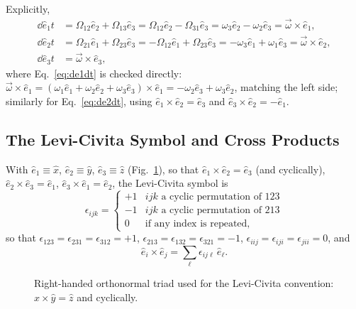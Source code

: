 \documentclass[11pt]{article}
\newcommand{\Om}{\Omega}
\begin{document}
Explicitly,
\begin{align}
\dd{\hat e_1}{t} &= \Om_{12}\hat e_2+\Om_{13}\hat e_3 = \Om_{12}\hat e_2-\Om_{31}\hat e_3 = \omega_3\hat e_2-\omega_2\hat e_3 = \vec\omega\times\hat e_1,\label{eq:de1dt}\\
\dd{\hat e_2}{t} &= \Om_{21}\hat e_1+\Om_{23}\hat e_3 = -\Om_{12}\hat e_1+\Om_{23}\hat e_3 = -\omega_3\hat e_1+\omega_1\hat e_3 = \vec\omega\times\hat e_2,\label{eq:de2dt}\\
\dd{\hat e_3}{t} &= \vec\omega\times\hat e_3,\label{eq:de3dt}
\end{align}
where Eq.~\eqref{eq:de1dt} is checked directly: $\vec\omega\times\hat e_1=(\omega_1\hat e_1+\omega_2\hat e_2+\omega_3\hat e_3)\times\hat e_1=-\omega_2\hat e_3+\omega_3\hat e_2$, matching the left side; similarly for Eq.~\eqref{eq:de2dt}, using $\hat e_1\times\hat e_2=\hat e_3$ and $\hat e_3\times\hat e_2=-\hat e_1$.

\subsection{The Levi-Civita Symbol and Cross Products}

With $\hat e_1\equiv\hat x$, $\hat e_2\equiv\hat y$, $\hat e_3\equiv\hat z$ (Fig.~\ref{fig:triad}), so that $\hat e_1\times\hat e_2=\hat e_3$ (and cyclically), $\hat e_2\times\hat e_3=\hat e_1$, $\hat e_3\times\hat e_1=\hat e_2$, the Levi-Civita symbol is
\begin{equation}
\epsilon_{ijk} = \begin{cases}
+1 & ijk \text{ a cyclic permutation of } 123\\
-1 & ijk \text{ a cyclic permutation of } 213\\
0 & \text{if any index is repeated,}
\end{cases}
\label{eq:levicivita}
\end{equation}
so that $\epsilon_{123}=\epsilon_{231}=\epsilon_{312}=+1$, $\epsilon_{213}=\epsilon_{132}=\epsilon_{321}=-1$, $\epsilon_{iij}=\epsilon_{iji}=\epsilon_{jii}=0$, and
\begin{equation}
\hat e_i\times\hat e_j = \sum_\ell \epsilon_{ij\ell}\,\hat e_\ell.
\label{eq:eixej}
\end{equation}

\begin{figure}[htb]
\centering
{}
\caption{Right-handed orthonormal triad used for the Levi-Civita convention: $\hat x\times\hat y=\hat z$ and cyclically.}
\label{fig:triad}
\end{figure}
\end{document}
